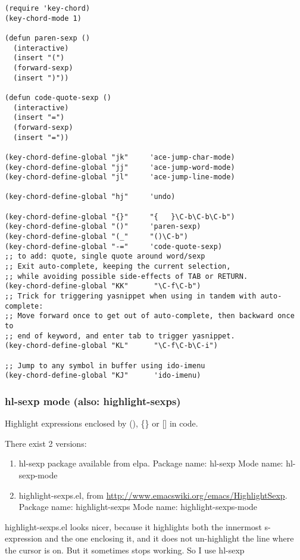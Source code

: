 \documentclass{article}
\begin{document}
\begin{verbatim}
(require 'key-chord)
(key-chord-mode 1)

(defun paren-sexp ()
  (interactive)
  (insert "(")
  (forward-sexp)
  (insert ")"))

(defun code-quote-sexp ()
  (interactive)
  (insert "=")
  (forward-sexp)
  (insert "="))

(key-chord-define-global "jk"     'ace-jump-char-mode)
(key-chord-define-global "jj"     'ace-jump-word-mode)
(key-chord-define-global "jl"     'ace-jump-line-mode)

(key-chord-define-global "hj"     'undo)

(key-chord-define-global "{}"     "{   }\C-b\C-b\C-b")
(key-chord-define-global "()"     'paren-sexp)
(key-chord-define-global "(_"     "()\C-b")
(key-chord-define-global "-="     'code-quote-sexp)
;; to add: quote, single quote around word/sexp
;; Exit auto-complete, keeping the current selection,
;; while avoiding possible side-effects of TAB or RETURN.
(key-chord-define-global "KK"      "\C-f\C-b")
;; Trick for triggering yasnippet when using in tandem with auto-complete:
;; Move forward once to get out of auto-complete, then backward once to
;; end of keyword, and enter tab to trigger yasnippet.
(key-chord-define-global "KL"      "\C-f\C-b\C-i")

;; Jump to any symbol in buffer using ido-imenu
(key-chord-define-global "KJ"      'ido-imenu)
\end{verbatim}

\subsubsection{hl-sexp mode (also: highlight-sexps)}
\label{sec-1-11-17}

Highlight expressions enclosed by (), \{\} or [] in code.

There exist 2 versions:

\begin{enumerate}
\item hl-sexp package available from elpa.
Package name: hl-sexp
Mode name: hl-sexp-mode
\item highlight-sexps.el, from \url{http://www.emacswiki.org/emacs/HighlightSexp}.
Package name: highlight-sexps
Mode name: highlight-sexps-mode
\end{enumerate}

highlight-sexps.el looks nicer, because it highlights both the innermost s-expression and the one enclosing it, and it does not un-highlight the line where the cursor is on.  But it sometimes stops working.  So I use hl-sexp
\end{document}
